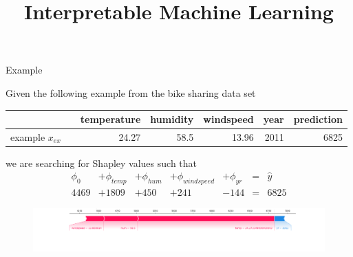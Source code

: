 \documentclass[11pt,compress,t,notes=noshow, aspectratio=169, xcolor=table]{beamer}
\title{Interpretable Machine Learning}
\date{}
\begin{document}
\newcommand{\titlefigure}{slides/shapley/figure_man/exSHAP.png}
\newcommand{\learninggoals}{
\item Get an intuition of additive feature attributions
\item Understand the concept of Kernel SHAP
\item Ability to interpret SHAP plots
\item Global SHAP methods
}


\begin{vbframe}{Example}

Given the following example from the bike sharing data set

\begin{table}[h]
\centering
\begin{tabular}{l rrrrr || r}
  \hline
  && temperature & humidity & windspeed & year & prediction\\ 
  \hline
 example $x_{ex}$ && 24.27 & 58.5 & 13.96 & 2011 & 6825 \\ 
 \hline
\end{tabular}
\end{table}

we are searching for Shapley values such that
\begin{equation}
\begin{array}{lllllcr}
\phi_0 &+ \phi_{temp} &+ \phi_{hum} &+ \phi_{windspeed} &+ \phi_{yr} & = &\hat{y} \\
4469 &+ 1809 &+ 450 &+ 241 &- 144 & = & 6825
\end{array}
\end{equation}

\begin{figure}
    \centering
    \includegraphics[width=\columnwidth]{slides/shapley/figure_man/exSHAP.png}
\end{figure}
\end{vbframe}
\end{document}

